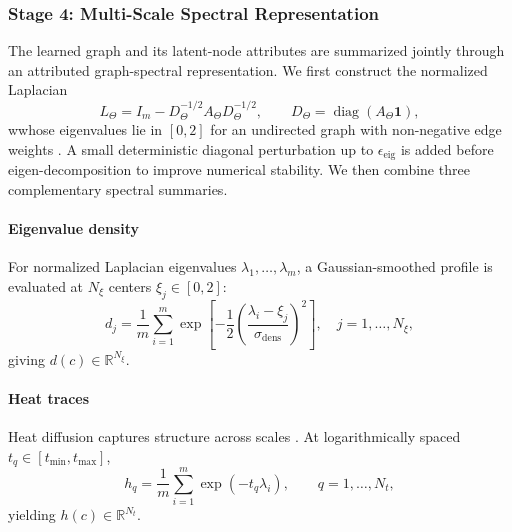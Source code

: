 \documentclass[final,5p,times,twocolumn]{elsarticle}
\theoremstyle{plain}
\begin{document}
\subsubsection{Stage 4: Multi-Scale Spectral Representation}
\label{sec:revised_multiscale_spectrum}
The learned graph and its latent-node attributes are summarized jointly through an attributed graph-spectral representation. We first construct the normalized Laplacian
\begin{equation}
L_{\Theta}
=
I_m-D_{\Theta}^{-1/2}A_{\Theta}D_{\Theta}^{-1/2},
\qquad
D_{\Theta}
=
\operatorname{diag}(A_{\Theta}\mathbf{1}),
\label{eq:revised_normalized_laplacian}
\end{equation}
wwhose eigenvalues lie in $[0,2]$ for an undirected graph with non-negative
edge weights \cite{chung1997spectral}. A small deterministic diagonal perturbation up to $\epsilon_{\mathrm{eig}}$ is added before eigen-decomposition to improve numerical stability. We then combine three complementary spectral summaries.

\paragraph{Eigenvalue density}
For normalized Laplacian eigenvalues
$\lambda_1,\ldots,\lambda_m$, a Gaussian-smoothed profile
\cite{banerjee2008spectrum,lewitus2016characterizing} is evaluated at
$N_\xi$ centers $\xi_j\in[0,2]$:
\begin{equation}
d_j
=
\frac{1}{m}
\sum_{i=1}^{m}
\exp\!\left[
-\frac{1}{2}
\left(
\frac{\lambda_i-\xi_j}{\sigma_{\mathrm{dens}}}
\right)^2
\right],
\quad
j=1,\ldots,N_{\xi},
\label{eq:revised_eigenvalue_density}
\end{equation}
giving $d(c)\in\mathbb{R}^{N_{\xi}}$.

\paragraph{Heat traces}
Heat diffusion captures structure across scales
\cite{sun2009concise}. At logarithmically spaced $t_q\in[t_{\min},t_{\max}]$,
\begin{equation}
h_q
=
\frac{1}{m}
\sum_{i=1}^{m}
\exp(-t_q\lambda_i),
\qquad
q=1,\ldots,N_t,
\label{eq:revised_heat_trace}
\end{equation}
yielding $h(c)\in\mathbb{R}^{N_t}$.
\end{document}
